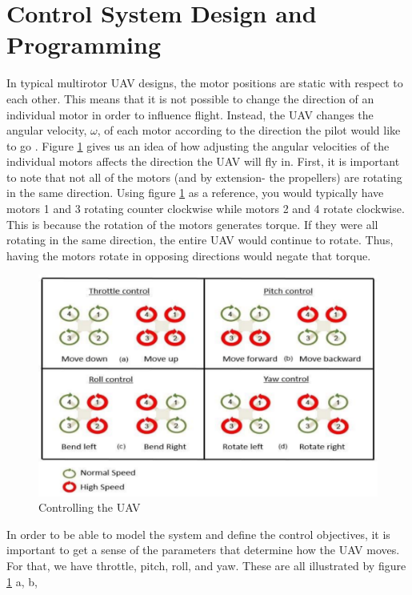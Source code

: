 \documentclass[english]{upeeei}
\begin{document}
\section{Control System Design and Programming}
In typical multirotor UAV designs, the motor positions are static with respect to each other. This means that it is not possible to change
the direction of an individual motor in order to influence flight. Instead, the UAV changes the angular velocity, $\omega$, of each motor according to
the direction the pilot would like to go \cite{fcDesign2019}. Figure \ref{fig:motor_signals} gives us an idea of how adjusting the angular
velocities of the individual motors affects the direction the UAV will fly in. First, it is important to note that not all of the motors
(and by extension- the propellers) are rotating in the same direction. Using figure \ref{fig:motor_signals} as a reference, you would
typically have motors 1 and 3 rotating counter clockwise while motors 2 and 4 rotate clockwise. This is because the rotation of the motors
generates torque. If they were all rotating in the same direction, the entire UAV would continue to rotate. Thus, having the motors rotate
in opposing directions would negate that torque. 
\begin{figure}[h]
    \centering
    \includegraphics[scale=0.5]{images/motor_signals.PNG}
    \caption{Controlling the UAV \cite{fcDesign2019}}
    \label{fig:motor_signals}
\end{figure}
\newline
In order to be able to model the system and define the control objectives, it is important to get a sense of the parameters that determine
how the UAV moves. For that, we have throttle, pitch, roll, and yaw. These are all illustrated by figure \ref{fig:motor_signals} a, b,
\end{document}
